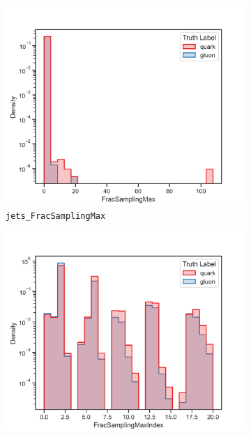 \begin{figure}[!htb]
	\centering
	\begin{subfigure}[t]{0.49\textwidth}
		\includegraphics[width=1\textwidth]{src/plots/distributions/highlevel/jets_FracSamplingMax.png}
		\caption{\texttt{jets\_FracSamplingMax}}
		\label{fig:highlevel_6}
	\end{subfigure}
	\begin{subfigure}[t]{0.49\textwidth}
		\includegraphics[width=1\textwidth]{src/plots/distributions/highlevel/jets_FracSamplingMaxIndex.png}

\end{subfigure}
\end{figure}
